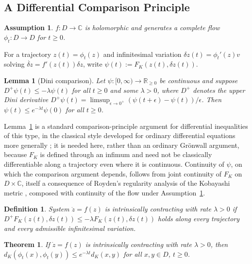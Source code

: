 \documentclass[pdflatex,sn-mathphys-num]{sn-jnl}%
\theoremstyle{thmstyleone}%
\newtheorem{theorem}{Theorem}%
\theoremstyle{thmstyletwo}%
\theoremstyle{thmstylethree}%
\newtheorem{definition}{Definition}%
\newtheorem{lemma}{Lemma} %
\newtheorem{assumption}{Assumption}
\begin{document}
\subsection{A Differential Comparison Principle}

\begin{assumption}
\label{ass:complete}
$f:D\to\mathbb{C}$ is holomorphic and generates a complete flow $\phi_t:D\to D$ for $t\ge0$.
\end{assumption}

For a trajectory $z(t)=\phi_t(z)$ and infinitesimal variation $\delta z(t)=\phi_t'(z)v$ solving $\dot{\delta z}=f'(z(t))\delta z$, write $\psi(t):=F_K(z(t),\delta z(t))$.

\begin{lemma}[Dini comparison]
\label{lem:dini}
Let $\psi:[0,\infty)\to\mathbb{R}_{\ge0}$ be continuous and suppose $D^+\psi(t)\le-\lambda\psi(t)$ for all $t\ge0$ and some $\lambda>0$, where $D^+$ denotes the upper Dini derivative $D^+\psi(t)=\limsup_{\epsilon\to0^+}(\psi(t+\epsilon)-\psi(t))/\epsilon$. Then $\psi(t)\le e^{-\lambda t}\psi(0)$ for all $t\ge0$.
\end{lemma}

Lemma~\ref{lem:dini} is a standard comparison-principle argument for differential inequalities of this type, in the classical style developed for ordinary differential equations more generally \cite{hartman2002ordinary}; it is needed here, rather than an ordinary Gr\"onwall argument, because $F_K$ is defined through an infimum and need not be classically differentiable along a trajectory even where it is continuous. Continuity of $\psi$, on which the comparison argument depends, follows from joint continuity of $F_K$ on $D\times\mathbb{C}$, itself a consequence of Royden's regularity analysis of the Kobayashi metric \cite{royden1971remarks}, composed with continuity of the flow under Assumption~\ref{ass:complete}.

\begin{definition}
\label{def:intrinsiccontraction}
System $\dot z=f(z)$ is intrinsically contracting with rate $\lambda>0$ if $D^+F_K(z(t),\delta z(t))\le-\lambda F_K(z(t),\delta z(t))$ holds along every trajectory and every admissible infinitesimal variation.
\end{definition}

\begin{theorem}
\label{thm:global}
If $\dot z=f(z)$ is intrinsically contracting with rate $\lambda>0$, then $d_K(\phi_t(x),\phi_t(y))\le e^{-\lambda t}d_K(x,y)$ for all $x,y\in D$, $t\ge0$.
\end{theorem}
\end{document}
